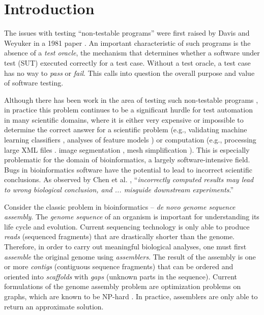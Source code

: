 \section{Introduction}

The issues with testing ``non-testable programs'' were first raised by Davis
and Weyuker in a 1981 paper \cite{Davis:1981:PNP:800175.809889}. An important
characteristic of such programs is the absence of a {\it test oracle}, the
mechanism that determines whether a software under test (SUT) executed
correctly for a test case.  Without a test oracle, a test case has no way to
{\it pass} or {\it fail}. This calls into question the overall purpose and
value of software testing.

Although there has been work in the area of testing such non-testable programs
\cite{McMinn:2009:SFD:1569901.1570127,Murphy:2010:MTT:1970820,Murphy:2009:AST:1572272.1572295,Yoo:2010:MTS:1799526.1799581,Chan:2010:FFP:1815297.1815298,Chen:2002:SIM:566172.566202,Lazic:2005:AMS:1983314.1983364,Just:2010:AST:1808266.1808280,Just:2011:AUI:2036458.2036488},
in practice this problem continues to be a significant hurdle for test
automation in many scientific domains, where it is either very expensive or
impossible to determine the correct answer for a scientific problem
\cite{Hook:2009:TTS:1556904.1556936} (e.g., validating machine learning
classifiers \cite{Xie:2011:TVM:1942318.1942371}, analyses of feature models
\cite{Segura:2011:AMT:1937186.1937327}) or computation (e.g., processing large
XML files \cite{Kim-Park:2010:ATO:1868048.1868050}.  image segmentation
\cite{Frounchi:2011:AIS:2038078.2038454}, mesh simplification
\cite{chan2009pat}).  This is especially problematic for the
domain of bioinformatics, a largely software-intensive field. Bugs in
bioinformatics software have the potential to lead to incorrect scientific
conclusions.  As observed by Chen et al.  \cite{BMC}, ``{\it incorrectly
computed results may lead to wrong biological conclusion, and ...
misguide downstream experiments}.''

Consider the classic problem in bioinformatics -- {\it de novo genome sequence assembly}.  The
{\it genome sequence} of an organism is important for understanding its life
cycle and evolution.  Current sequencing technology is only able to produce
{\it reads} (sequenced fragments) that are drastically shorter than the genome.
Therefore, in order to carry out meaningful biological analyses, one must first
{\it assemble} the original genome using {\it assemblers}.  The result of the
assembly is one or more {\it contigs} (contiguous sequence fragments) that can
be ordered and oriented into {\it scaffolds} with {\it gaps} (unknown parts in
the sequence).  Current formulations of the genome assembly problem are
optimization problems on graphs, which are known to be NP-hard
\cite{medvedev2007computability}.  In practice, assemblers are only able to
return an approximate solution.

